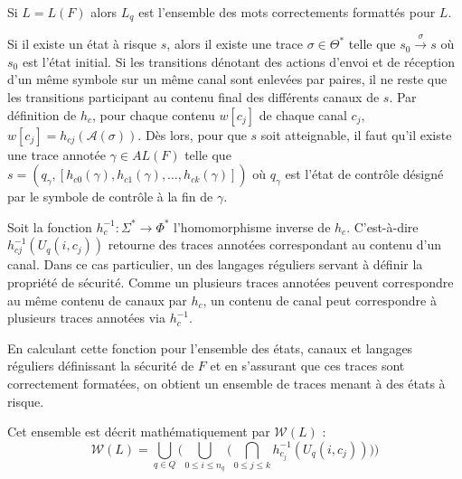 Si $L=L(F)$ alors $L_q$ est l'ensemble des mots correctements formattés pour $L$.

Si il existe un état à risque $s$, alors il existe une trace $\sigma \in \Theta^*$ telle que $s_0\xrightarrow{\sigma}s$ où $s_0$ est l'état initial. Si les transitions dénotant des actions d'envoi et de réception d'un même symbole sur un même canal sont enlevées par paires, il ne reste que les transitions participant au contenu final des différents canaux de $s$. Par définition de $h_c$, pour chaque contenu $w[c_j]$ de chaque canal $c_j$, $w[c_j]=h_{cj}(\mathcal{A}(\sigma))$. Dès lors, pour que $s$ soit atteignable, il faut qu'il existe une trace annotée $\gamma \in AL(F)$ telle que $s=(q_\gamma, [h_{c0}(\gamma),h_{c1}(\gamma),\dots,h_{ck}(\gamma)])$ où $q_\gamma$ est l'état de contrôle désigné par le symbole de contrôle à la fin de $\gamma$.

Soit la fonction $h^{-1}_{c}:\Sigma^*\rightarrow\Phi^*$ l'homomorphisme inverse de $h_c$. C'est-à-dire $h^{-1}_{cj}(U_q(i,c_j))$ retourne des traces annotées correspondant au contenu d'un canal. Dans ce cas particulier, un des langages réguliers servant à définir la propriété de sécurité. Comme un plusieurs traces annotées peuvent correspondre au même contenu de canaux par $h_c$, un contenu de canal peut correspondre à plusieurs traces annotées via $h^{-1}_c$.

En calculant cette fonction pour l'ensemble des états, canaux et langages réguliers définissant la sécurité de $F$ et en s'assurant que ces traces sont correctement formatées, on obtient un ensemble de traces menant à des états à risque.

Cet ensemble est décrit mathématiquement par $\mathcal{W}(L)$ :
$$
\mathcal{W}(L)=\bigcup_{q\in Q}\big(\bigcup_{0\leq i\leq n_q}\big(\bigcap_{0\leq j \leq k}h_{c_j}^{-1}(U_q(i,c_j))\big)\big)
$$
